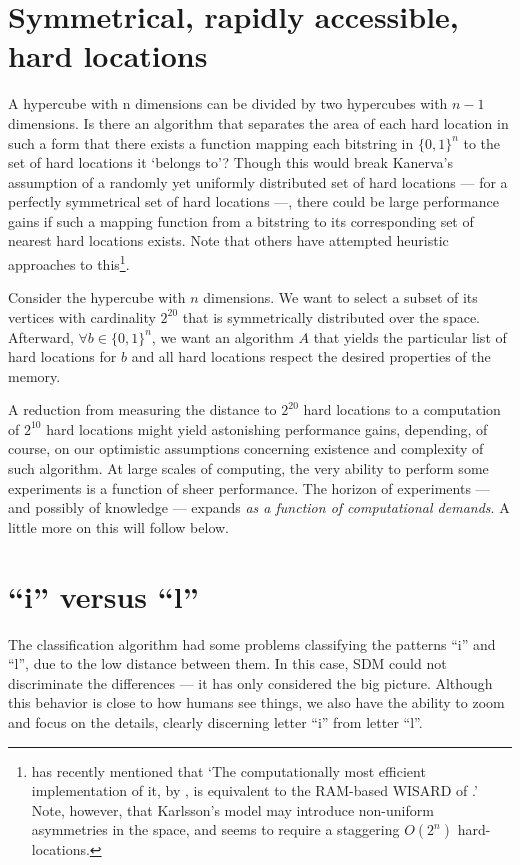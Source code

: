 \section{Symmetrical, rapidly accessible, hard locations}

A hypercube with n dimensions can be divided by two hypercubes with $n-1$ dimensions. Is there an algorithm that separates the area of each hard location in such a form that there exists a function mapping each bitstring in $\{0,1\}^n$ to the set of hard locations it `belongs to'?  Though this would break Kanerva's assumption of a randomly yet uniformly distributed set of hard locations --- for a perfectly symmetrical set of hard locations ---, there could be large performance gains if such a mapping function from a bitstring to its corresponding set of nearest hard locations exists. Note that others have attempted heuristic approaches to this\footnote{\citet{Kanerva2009} has recently mentioned that `The computationally most efficient implementation of it, by \citet{Karlsson95afast}, is equivalent to the RAM-based WISARD of  \citet{aleksander1982computer}.' Note, however, that Karlsson's model may introduce non-uniform asymmetries in the space, and seems to require a staggering $O(2^n)$ hard-locations.}.

Consider the hypercube with $n$ dimensions.  We want to select a subset of its vertices with cardinality $2^{20}$ that is symmetrically distributed over the space. Afterward, $\forall b \in \{ 0,1\} ^n$, we want an algorithm $A$ that yields the particular list of hard locations for $b$ and all hard locations respect the desired properties of the memory.

A reduction from measuring the distance to $2^{20}$ hard locations to a computation of $2^{10}$ hard locations might yield astonishing performance gains, depending, of course, on our optimistic assumptions concerning existence and complexity of such algorithm.  At large scales of computing, the very ability to perform some experiments is a function of sheer performance. The horizon of experiments --- and possibly of knowledge --- expands \emph{as a function of computational demands}. A little more on this will follow below.




\section{``i'' versus ``l''}

The classification algorithm had some problems classifying the patterns ``i'' and ``l'', due to the low distance between them. In this case, SDM could not discriminate the differences --- it has only considered the big picture. Although this behavior is close to how humans see things, we also have the ability to zoom and focus on the details, clearly discerning letter ``i'' from letter ``l''.

